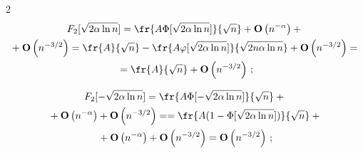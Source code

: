 \begin{multicols}{2}
 \begin{multline}


F_2[\sqrt{2\alpha\ln n}] =\fr{A\Phi[\sqrt{2\alpha\ln n}]}{\sqrt{n}}


  + \mathbf{O}\left(n^{-\alpha}\right) +{}\\


  {}+\mathbf{O}\left(n^{-3/2}\right)=


  \fr{A}{\sqrt{n}}-\fr{A\varphi[\sqrt{2\alpha\ln n}]}{\sqrt{2n\alpha\ln n}}


  + \mathbf{O}\left(n^{-3/2}\right)={}\\


  {}=\fr{A}{\sqrt{n}}


  + \mathbf{O}\left(n^{-3/2}\right)\,;


\label{e38-ch}


 \end{multline}





  \vspace*{-12pt}


 


 \noindent


 \begin{multline}


F_2[-\sqrt{2\alpha\ln n}] =\fr{A\Phi[-\sqrt{2\alpha\ln n}]}{\sqrt{n}}


   +{}\\


   {}+ \mathbf{O}\left(n^{-\alpha}\right) +\mathbf{O}\left(n^{-3/2}\right)=


=\fr{A(1-\Phi[\sqrt{2\alpha\ln n}])}{\sqrt{n}}+{}\\


{}  + \mathbf{O}\left(n^{-\alpha}\right) +\mathbf{O}\left(n^{-3/2}\right)


  = \mathbf{O}\left(n^{-3/2}\right)\,;


 \label{e39-ch}


 \end{multline}


 


  \vspace*{-12pt}


 


 \noindent


 \begin{multline}



\end{multline}
\end{multicols}
